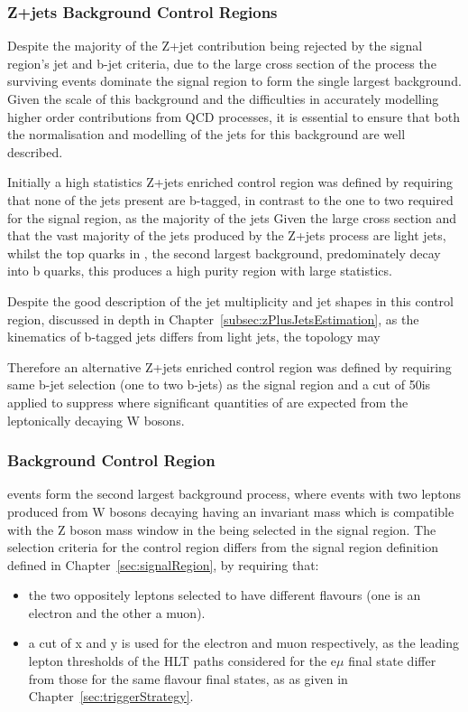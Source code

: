 \subsubsection{Z+jets Background Control Regions}\label{subsec:zPlusJetsCR}
Despite the majority of the Z+jet contribution being rejected by the signal region's jet and b-jet criteria, due to the large cross section of the process the surviving events dominate the signal region to form the single largest background.
Given the scale of this background and the difficulties in accurately modelling higher order contributions from QCD processes, it is essential to ensure that both the normalisation and modelling of the jets for this background are well described.

Initially a high statistics Z+jets enriched control region was defined by requiring that none of the jets present are b-tagged, in contrast to the one to two required for the signal region, as the majority of the jets 
Given the large cross section and that the vast majority of the jets produced by the Z+jets process are light jets, whilst the top quarks in \ttbar, the second largest background, predominately decay into b quarks, this produces a high purity region with large statistics.

Despite the good description of the jet multiplicity and jet \pT shapes in this control region, discussed in depth in Chapter~\ref{subsec:zPlusJetsEstimation}, as the kinematics of b-tagged jets differs from light jets, the topology may 

Therefore an alternative Z+jets enriched control region was defined by requiring same b-jet selection (one to two b-jets) as the signal region and a \MET cut of 50\GeV is applied to suppress \ttbar where significant quantities of \MET are expected from the leptonically decaying W bosons.

\subsubsection{\ttbar Background Control Region}\label{subsec:ttbarCR}
\ttbar events form the second largest background process, where events with two leptons produced from W bosons decaying having an invariant mass which is compatible with the Z boson mass window in the being selected in the signal region.
The selection criteria for the \ttbar control region differs from the signal region definition defined in Chapter~\ref{sec:signalRegion}, by requiring that:
\begin{itemize}
\item the two oppositely leptons selected to have different flavours (\ie one is an electron and the other a muon).
\item a \pt cut of x and y is used for the electron and muon respectively, as the leading lepton \pt thresholds of the HLT paths considered for the e$\mu$ final state differ from those for the same flavour final states, as as given in Chapter~\ref{sec:triggerStrategy}. 
\end{itemize} 

